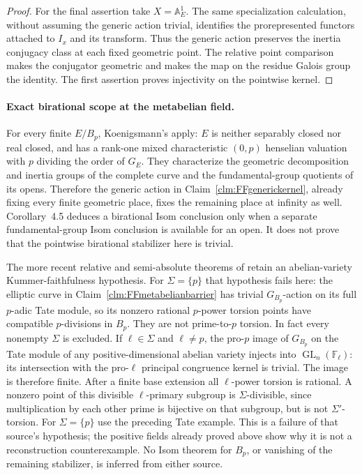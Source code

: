 \documentclass[11pt]{article}
\begin{document}
\begin{proof}
For the final assertion take \(X=\mathbb A^1_E\).
The same specialization calculation, without assuming
the generic action trivial, identifies the prorepresented
functors attached to \(I_x\) and its transform. Thus
the generic action preserves the inertia conjugacy class
at each fixed geometric point. The relative point
comparison makes the conjugator geometric and makes the
map on the residue Galois group the identity. The first
assertion proves injectivity on the pointwise kernel.
\end{proof}

\paragraph{Exact birational scope at the metabelian field.}
For every finite \(E/B_p\), Koenigsmann's
\citet[Theorem~4.1, Corollaries~4.3 and~4.5]
{FF_Koenigsmann2003} apply: \(E\) is neither separably
closed nor real closed, and has a rank-one mixed
characteristic \((0,p)\) henselian valuation with
\(p\) dividing the order of \(G_E\).
They characterize the geometric decomposition and inertia
groups of the complete curve and the fundamental-group
quotients of its opens. Therefore the generic action in
Claim~\ref{clm:FFgenerickernel}, already fixing every
finite geometric place, fixes the remaining place at
infinity as well. Corollary~4.5 deduces a birational
Isom conclusion only when a separate fundamental-group
Isom conclusion is available for an open. It does not
prove that the pointwise birational stabilizer here is
trivial.

The more recent relative and semi-absolute theorems of
\citet[Theorems~A and~E, Definition~1.1,
Proposition~2.6]{FF_Tsujimura2026} retain an abelian-variety
Kummer-faithfulness hypothesis. For \(\Sigma=\{p\}\)
that hypothesis fails here: the elliptic curve in
Claim~\ref{clm:FFmetabelianbarrier} has trivial
\(G_{B_p}\)-action on its full \(p\)-adic Tate module,
so its nonzero rational \(p\)-power torsion points have
compatible \(p\)-divisions in \(B_p\). They are not
prime-to-\(p\) torsion. In fact every nonempty
\(\Sigma\) is excluded. If \(\ell\in\Sigma\)
and \(\ell\ne p\), the pro-\(p\) image of
\(G_{B_p}\) on the Tate module of any positive-dimensional
abelian variety injects into \(\operatorname{GL}_n(\mathbb F_\ell)\):
its intersection with the pro-\(\ell\) principal
congruence kernel is trivial. The image is therefore
finite. After a finite base extension all
\(\ell\)-power torsion is rational. A nonzero point
of this divisible \(\ell\)-primary subgroup is
\(\Sigma\)-divisible, since multiplication by each
other prime is bijective on that subgroup, but is not
\(\Sigma'\)-torsion. For \(\Sigma=\{p\}\) use
the preceding Tate example. This is a failure of that
source's hypothesis; the positive fields already proved
above show why it is not a reconstruction counterexample.
No Isom theorem for \(B_p\),
or vanishing of the remaining stabilizer, is inferred
from either source.
\end{document}
